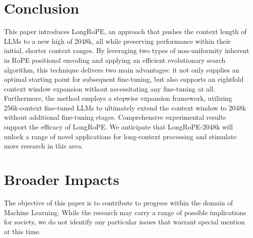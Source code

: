 \section{Conclusion}

This paper introduces LongRoPE, an approach that pushes the context length of LLMs to a new high of 2048k, all while preserving performance within their initial, shorter context ranges. By leveraging two types of non-uniformity inherent in RoPE positional encoding and applying an efficient evolutionary search algorithm, this technique delivers two main advantages: it not only supplies an optimal starting point for subsequent fine-tuning, but also supports an eightfold context window expansion without necessitating any fine-tuning at all. Furthermore, the method employs a stepwise expansion framework, utilizing 256k-context fine-tuned LLMs to ultimately extend the context window to 2048k without additional fine-tuning stages. Comprehensive experimental results support the efficacy of LongRoPE. We anticipate that LongRoPE-2048k will unlock a range of novel applications for long-context processing and stimulate more research in this area.

\section*{Broader Impacts} The objective of this paper is to contribute to progress within the domain of Machine Learning. While the research may carry a range of possible implications for society, we do not identify any particular issues that warrant special mention at this time.

	\balance

